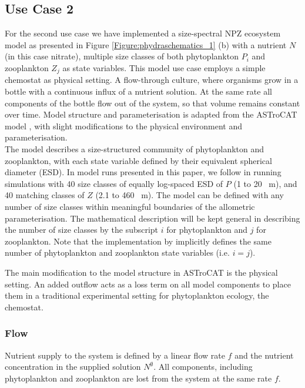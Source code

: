 \documentclass[template.tex]{subfiles}
\begin{document}
\subsection{Use Case 2}

For the second use case we have implemented a size-spectral NPZ ecosystem model as presented in Figure \ref{Figure:phydraschematics_1} (b) with a nutrient $N$ (in this case nitrate), multiple size classes of both phytoplankton $P_i$ and zooplankton $Z_j$ as state variables. 
This model use case employs a simple chemostat as physical setting. A flow-through culture, where organisms grow in a bottle with a continuous influx of a nutrient solution. At the same rate all components of the bottle flow out of the system, so that volume remains constant over time.
Model structure and parameterisation is adapted from the ASTroCAT model \citep{Banas2011b}, with slight modifications to the physical environment and parameterisation. 
\\
The model describes a size-structured community of phytoplankton and zooplankton, with each state variable defined by their equivalent spherical diameter (ESD). In model runs presented in this paper, we follow \citet{Banas2011b} in running simulations with 40 size classes of equally log-spaced ESD of $P$ (1 to 20 \unit{\mu m}), and 40 matching classes of $Z$ (2.1 to 460  \unit{\mu m}). 
The model can be defined with any number of size classes within meaningful boundaries of the allometric parameterisation. The mathematical description will be kept general in describing the number of size classes by the subscript $i$ for phytoplankton and $j$ for zooplankton. Note that the implementation by \citeauthor{Banas2011b} implicitly defines the same number of phytoplankton and zooplankton state variables (i.e. $i = j$).

The main modification to the model structure in ASTroCAT is the physical setting. An added outflow acts as a loss term on all model components to place them in a traditional experimental setting for phytoplankton ecology, the chemostat. 

\subsubsection{Flow}

Nutrient supply to the system is defined by a linear flow rate $f$ and the nutrient concentration in the supplied solution $N^\emptyset$. All components, including phytoplankton and zooplankton are lost from the system at the same rate $f$.
\end{document}
